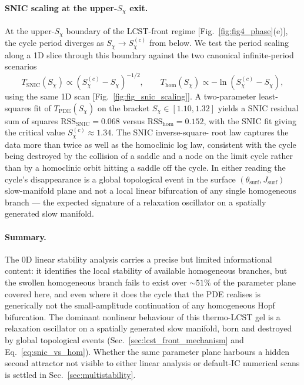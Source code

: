 \paragraph{SNIC scaling at the upper-$S_\chi$ exit.}
At the upper-$S_\chi$ boundary of the LCST-front regime
[Fig.~\ref{fig:fig4_phase}(e)], the cycle period diverges as
$S_\chi\to S_\chi^{(c)}$ from below.  We test the period scaling
along a 1D slice through this boundary against the two canonical
infinite-period scenarios
\begin{equation}
  T_\mathrm{SNIC}(S_\chi)\propto (S_\chi^{(c)}-S_\chi)^{-1/2},
  \qquad
  T_\mathrm{hom}(S_\chi)\propto -\ln(S_\chi^{(c)}-S_\chi),
  \label{eq:snic_vs_hom}
\end{equation}
using the same 1D scan
[Fig.~\ref{fig:fig_snic_scaling}].  A two-parameter least-squares fit
of $T_\mathrm{PDE}(S_\chi)$ on the bracket
$S_\chi\in[1.10, 1.32]$ yields a SNIC residual sum of squares
$\mathrm{RSS}_\mathrm{SNIC}=0.068$ versus
$\mathrm{RSS}_\mathrm{hom}=0.152$, with the SNIC fit giving the
critical value $S_\chi^{(c)}\!\approx\!1.34$.  The SNIC inverse-square-
root law captures the data more than twice as well as the homoclinic
log law, consistent with the cycle being destroyed by the collision
of a saddle and a node on the limit cycle rather than by a homoclinic
orbit hitting a saddle off the cycle.  In either reading the cycle's
disappearance is a global topological event in the surface
$(\theta_\mathrm{surf}, J_\mathrm{surf})$ slow-manifold plane and not
a local linear bifurcation of any single homogeneous branch — the
expected signature of a relaxation oscillator on a spatially
generated slow manifold.

\paragraph{Summary.}
The 0D linear stability analysis carries a precise but limited
informational content: it identifies the local stability of available
homogeneous branches, but the swollen homogeneous branch fails to
exist over $\sim\!51\%$ of the parameter plane covered here, and even
where it does the cycle that the PDE realises is generically not the
small-amplitude continuation of any homogeneous Hopf bifurcation.
The dominant nonlinear behaviour of this thermo-LCST gel is a
relaxation oscillator on a spatially generated slow manifold, born
and destroyed by global topological events
(Sec.~\ref{sec:lcst_front_mechanism} and Eq.~\ref{eq:snic_vs_hom}).
Whether the same parameter plane harbours a hidden second attractor
not visible to either linear analysis or default-IC numerical scans
is settled in Sec.~\ref{sec:multistability}.
